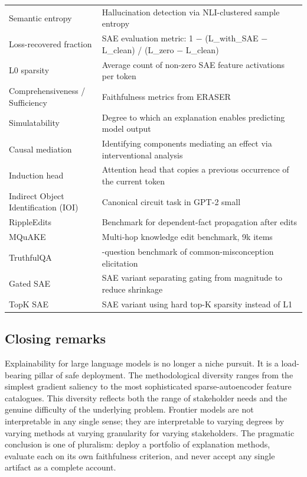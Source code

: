 \documentclass{article}
\begin{document}
\begin{table}[t]
\begin{tabular}{>{\raggedright\arraybackslash}p{0.3186\linewidth}
  >{\raggedright\arraybackslash}p{0.6814\linewidth}}
Semantic entropy & Hallucination detection via NLI-clustered sample entropy \\
Loss-recovered fraction & SAE evaluation metric: 1 − (L\_with\_SAE − L\_clean) / (L\_zero − L\_clean) \\
L0 sparsity & Average count of non-zero SAE feature activations per token \\
Comprehensiveness / Sufficiency & Faithfulness metrics from ERASER \\
Simulatability & Degree to which an explanation enables predicting model output \\
Causal mediation & Identifying components mediating an effect via interventional analysis \\
Induction head & Attention head that copies a previous occurrence of the current token \\
Indirect Object Identification (IOI) & Canonical circuit task in GPT-2 small \\
RippleEdits & Benchmark for dependent-fact propagation after edits \\
MQuAKE & Multi-hop knowledge edit benchmark, 9k items \\
TruthfulQA & 817-question benchmark of common-misconception elicitation \\
Gated SAE & SAE variant separating gating from magnitude to reduce shrinkage \\
TopK SAE & SAE variant using hard top-K sparsity instead of L1 \\
\end{tabular}
\end{table}

\subsection{Closing remarks}\label{closing-remarks}

Explainability for large language models is no longer a niche pursuit. It is a load-bearing pillar of safe deployment. The methodological diversity ranges from the simplest gradient saliency to the most sophisticated sparse-autoencoder feature catalogues. This diversity reflects both the range of stakeholder needs and the genuine difficulty of the underlying problem. Frontier models are not interpretable in any single sense; they are interpretable to varying degrees by varying methods at varying granularity for varying stakeholders. The pragmatic conclusion is one of pluralism: deploy a portfolio of explanation methods, evaluate each on its own faithfulness criterion, and never accept any single artifact as a complete account.
\end{document}
